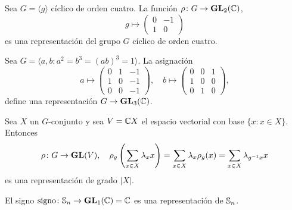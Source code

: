 \begin{example}
Sea $G=\langle g\rangle$ cíclico de orden cuatro. 
La función $\rho\colon G\to\mathbf{GL}_2(\mathbb{C})$, 
\[
g\mapsto
\begin{pmatrix}
0&-1\\
1&0
\end{pmatrix}
\] 
es una representación del grupo $G$ cíclico de orden cuatro. 
\end{example}


\begin{example}
  Sea $G=\langle a,b:a^2=b^3=(ab)^3=1\rangle$. La asignación 
  \[
    a\mapsto\begin{pmatrix}
    0 & 1 & -1\\
    1 & 0 & -1\\
    0 & 0 & -1
    \end{pmatrix},
    \quad
    b\mapsto\begin{pmatrix}
      0 & 0 & 1\\
      1 & 0 & 0\\
      0 & 1 & 0
    \end{pmatrix},
  \]
  define una representación $G\to\mathbf{GL}_3(\mathbb{C})$. 
\end{example}


\begin{example}
  Sea $X$ un $G$-conjunto y sea $V=\mathbb{C} X$ el espacio vectorial con base $\{x:x\in
  X\}$. Entonces
  \[
	\rho\colon G\to\mathbf{GL}(V),\quad
	\rho_g\left(\sum_{x\in X}\lambda_x x\right)
	=\sum_{x\in X}\lambda_x\rho_g(x)
	=\sum_{x\in X}\lambda_{g^{-1}x}x
  \]
  es una representación de grado $|X|$.
\end{example}

\begin{example}
El signo $\operatorname{signo}\colon\mathbb{S}_n\to\mathbf{GL}_1(\mathbb{C})=\mathbb{C}$ es una representación de $\mathbb{S}_n$.
\end{example}

